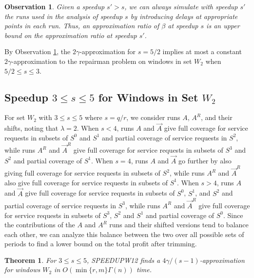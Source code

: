 \documentclass[11pt]{article}
\newtheorem{theorem}{Theorem}[section]
\newtheorem{observation}{Observation}[section]
\begin{document}
\begin{observation}
\label{observation:speedup}
Given a speedup $s' > s$, we can always simulate with speedup $s'$ the runs used in the analysis of speedup $s$ by introducing delays at appropriate points in each run.  Thus, an approximation ratio of $\beta$ at speedup $s$ is an upper bound on the approximation ratio at speedup $s'$.
\end{observation}

By Observation \ref{observation:speedup}, the $2\gamma$-approximation for $s = 5/2$ implies at most a constant $2\gamma$-approximation to the repairman problem on windows in set $W_2$ when $5/2 \leq s \leq 3$.

\subsection{Speedup $3 \leq s \leq 5$ for Windows in Set $W_2$}

For set $W_2$ with $3 \leq s \leq 5$ where $s = q/r$, we consider runs $A$, $A^R$, and their shifts, noting that $\lambda = 2$.
When $s < 4$, runs $A$ and $\vec{A}$ give full coverage for service requests in subsets of $S^0$ and $S^1$ and partial coverage of service requests in $S^2$, while runs $A^R$ and $\vec{A}^R$ give full coverage for service requests in subsets of $S^3$ and $S^2$ and partial coverage of $S^1$.  When $s = 4$, runs $A$ and $\vec{A}$ go further by also giving full coverage for service requests in subsets of $S^2$, while runs $A^R$ and $\vec{A}^R$ also give full coverage for service requests in subsets of $S^1$.  When $s > 4$, runs $A$ and $\vec{A}$ give full coverage for service requests in subsets of $S^0$, $S^1$, and $S^2$ and partial coverage of service requests in $S^3$, while runs $A^R$ and $\vec{A}^R$ give full coverage for service requests in subsets of $S^3$, $S^2$ and $S^1$ and partial coverage of $S^0$.  Since the contributions of the $A$ and $A^R$ runs and their shifted versions tend to balance each other, we can analyze this balance between the two over all possible sets of periods to find a lower bound on the total profit after trimming.

\begin{theorem}
For $3 \leq s \leq 5$, SPEEDUPW12 finds a $4\gamma /(s - 1)$-approximation for windows $W_2$ in $O(\min\{r, m\}\Gamma(n))$ time.
\end{theorem}
\end{document}
